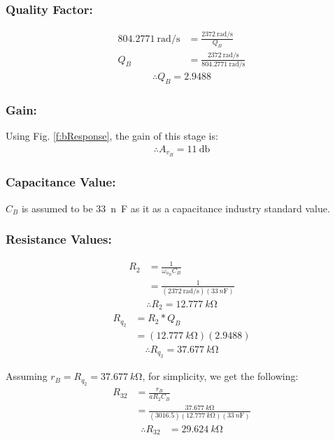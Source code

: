 \documentclass[hidelinks]{article}
\begin{document}
	\subsubsection*{Quality Factor:}
	\begin{align*}
		\SI{804.2771}{\radian/\second} &= \frac{\SI{2372}{\radian/\second}}{Q_B}\\
		Q_B &= \frac{\SI{2372}{\radian/\second}}{\SI{804.2771}{\radian/\second}}
	\end{align*}
	\begin{align*}
		\therefore Q_B = 2.9488
	\end{align*}
	\subsubsection*{Gain:}
	Using Fig. \ref{f:bResponse}, the gain of this stage is:
	\begin{align*}
		\therefore A_{v_B} = \SI{11}{\decibel}
	\end{align*}
	\subsubsection*{Capacitance Value:}
	$C_B$ is assumed to be \SI{33}{n\farad} as it as a capacitance industry standard value.
	\subsubsection*{Resistance Values:}
	\begin{align}
		R_2 &= \frac{1}{\omega_{o_B} C_B}\\
		&= \frac{1}{(\SI{2372}{\radian/\second}) (\SI{33}{n\farad})} \nonumber
	\end{align}
	\begin{align*}
		\therefore R_{2} = \SI{12.777}{k\ohm}	
	\end{align*}
	\begin{align}
		R_{q_2} &= R_2* Q_B\\
		&= (\SI{12.777}{k\ohm}) (2.9488) \nonumber
	\end{align}
	\begin{align*}
		\therefore R_{q_2} = \SI{37.677}{k\ohm}		
	\end{align*}
	
	\pagebreak
	\noindent Assuming $r_B = R_{q_2} = \SI{37.677}{k\ohm}$, for simplicity, we get the following:
	\begin{align}
		R_{32} &= \frac{r_B}{a R_2 C_B}\\
		&= \frac{\SI{37.677}{k\ohm}}{(3016.5) (\SI{12.777}{k\ohm}) (\SI{33}{n\farad})} \nonumber
	\end{align}
	\begin{align*}
		\therefore R_{32} &= \SI{29.624}{k\ohm}
	\end{align*}
	
\end{document}
